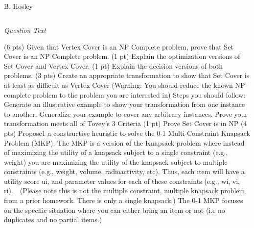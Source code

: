 \documentclass[12pt]{amsart}
\begin{document}
\raggedbottom

\hspace{\fill} {\large B. Hosley}
\bigskip


\setcounter{section}{1}

\subsection{}
\textit{Question Text}




(6 pts) Given that Vertex Cover is an NP Complete problem, prove that Set Cover is an NP Complete problem.
(1 pt) Explain the optimization versions of Set Cover and Vertex Cover.
(1 pt) Explain the decision versions of both problems. 
(3 pts) Create an appropriate transformation to show that Set Cover is at least as difficult as Vertex Cover (Warning: You should reduce the known NP-complete problem to the problem you are interested in) Steps you should follow:
Generate an illustrative example to show your transformation from one instance to another.
Generalize your example to cover any arbitrary instances.
Prove your transformation meets all of Tovey’s 3 Criteria
(1 pt) Prove Set Cover is in NP
(4 pts) Propose1 a constructive heuristic to solve the 0-1 Multi-Constraint Knapsack Problem (MKP).  
The MKP is a version of the Knapsack problem where instead of maximizing the utility of a knapsack subject to a single constraint (e.g., weight) you are maximizing the utility of the knapsack subject to multiple constraints (e.g., weight, volume, radioactivity, etc).  Thus, each item will have a utility score ui, and parameter values for each of these constraints (e.g., wi, vi, ri).    (Please note this is not the multiple constraint, multiple knapsack problem from a prior homework.  There is only a single knapsack.)
The 0-1 MKP focuses on the specific situation where you can either bring an item or not (i.e no duplicates and no partial items.)     
\end{document}
